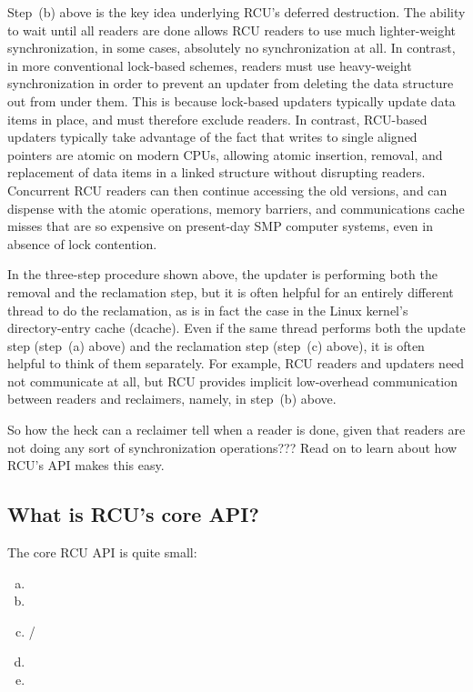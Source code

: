 Step~(b) above is the key idea underlying RCU's deferred destruction.
The ability to wait until all readers are done allows RCU readers to
use much lighter-weight synchronization, in some cases, absolutely no
synchronization at all.
In contrast, in more conventional lock-based
schemes, readers must use heavy-weight synchronization in order to
prevent an updater from deleting the data structure out from under them.
This is because lock-based updaters typically update data items in place,
and must therefore exclude readers.
In contrast, RCU-based updaters
typically take advantage of the fact that writes to single aligned
pointers are atomic on modern CPUs, allowing atomic insertion, removal,
and replacement of data items in a linked structure without disrupting
readers.
Concurrent RCU readers can then continue accessing the old
versions, and can dispense with the atomic operations, memory barriers,
and communications cache misses that are so expensive on present-day
SMP computer systems, even in absence of lock contention.

In the three-step procedure shown above, the updater is performing both
the removal and the reclamation step, but it is often helpful for an
entirely different thread to do the reclamation, as is in fact the case
in the Linux kernel's directory-entry cache (dcache).
Even if the same
thread performs both the update step (step~(a) above) and the reclamation
step (step~(c) above), it is often helpful to think of them separately.
For example, RCU readers and updaters need not communicate at all,
but RCU provides implicit low-overhead communication between readers
and reclaimers, namely, in step~(b) above.

So how the heck can a reclaimer tell when a reader is done, given
that readers are not doing any sort of synchronization operations???
Read on to learn about how RCU's API makes this easy.

\subsection{What is RCU's core API?}
\label{sec:rcu:What is RCU's core API?}

The core RCU API is quite small:

\begin{enumerate}[(a)]
\item	{}
\item	{}
\item	{} / 
\item	{}
\item	{}
\end{enumerate}

